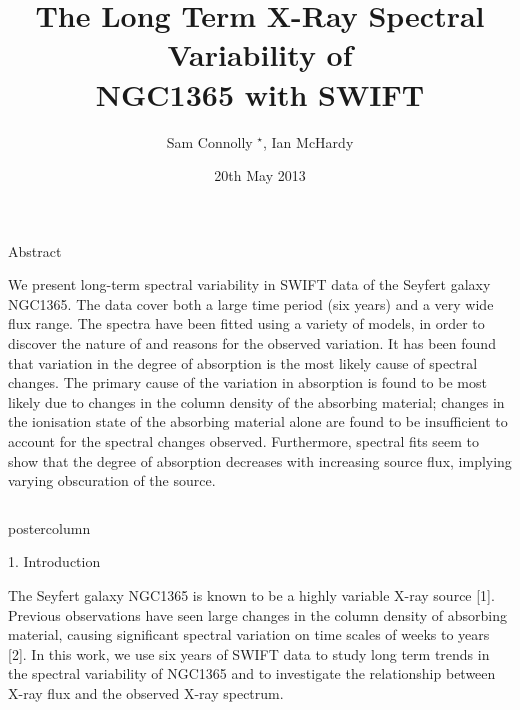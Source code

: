 \documentclass[final]{beamer}
\title{ The Long Term X-Ray Spectral Variability of\\ \vspace{1cm}
  \hspace{0.1cm} NGC1365 with SWIFT \vspace{1cm}}
\author{Sam Connolly $ ^{\star}$, Ian McHardy}
\institute{{\small $^{\star}$ Email: sdc1g08@soton.ac.uk}\hspace{370pt}
	      School of Physics and Astronomy, University of Southampton, UK}
\date[20th May 2013]{20th May 2013}
\subtitle{\hspace{18cm}}
\newlength{\columnheight}
\begin{document}
\begin{frame}

            \begin{block}{\begin{center} Abstract \end{center}} 
			We present long-term spectral variability in SWIFT data of the Seyfert galaxy NGC1365. 
			The data cover both a large time period (six years) and a very wide flux range.
			The spectra have been fitted using a variety of models, in order to 
			discover the nature of and reasons for the observed variation. It has 
			been found that variation in the degree of absorption is the most 
			likely cause of spectral changes. The primary cause of the variation
			in absorption is found to be most likely due to changes in the
			column density of the absorbing material; changes in the ionisation state of the
			absorbing material alone are found to be insufficient to account for the spectral changes observed. 
			Furthermore, spectral fits seem to show that the degree of absorption decreases with 
			increasing source flux, implying varying obscuration of the source.
            \end{block}
            
            \vfill

  \begin{columns}
  
    
    \begin{column}{.5\textwidth}
      \begin{beamercolorbox}[center,wd=\textwidth]{postercolumn}
        \begin{minipage}[T]{.98\textwidth}  %
								
          \parbox[t][\columnheight]{\textwidth}{ 


            \begin{block}{1. Introduction}
            
			
 		The Seyfert galaxy NGC1365 is known to be a highly variable X-ray source [1]. Previous observations have seen large
 		changes in the column density of absorbing material, causing significant spectral variation on time scales of weeks to years [2]. 
 		In this work, we use six years of SWIFT data to study long term trends in the spectral variability of NGC1365 and to investigate the relationship 
 		between X-ray flux and the observed X-ray spectrum.
		

\end{block}}
\end{minipage}
\end{beamercolorbox}
\end{column}
\end{columns}
\end{frame}
\end{document}
